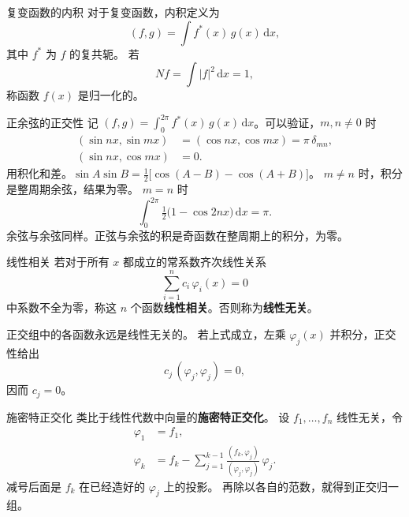 \documentclass[fontset=windows, chinese, 10pt, xcolor=dvipsnames]{beamer}
\begin{document}
\begin{frame}{复变函数的内积}
  对于复变函数，内积定义为
  \begin{equation*}
    (f,g)=\int f^*(x)\,g(x)\,\mathrm{d}x,
  \end{equation*}
  其中 $f^*$ 为 $f$ 的复共轭。
  若
  \begin{equation*}
    Nf=\int |f|^2\,\mathrm{d}x=1,
  \end{equation*}
  称函数 $f(x)$ 是归一化的。
\end{frame}

\begin{frame}{正余弦的正交性}
  记 $(f,g)=\displaystyle\int_0^{2\pi} f^*(x)\,g(x)\,\mathrm{d}x$。可以验证，$m,n\neq 0$ 时
  \begin{align*}
    (\sin nx,\sin mx)
      &=(\cos nx,\cos mx)=\pi\,\delta_{mn},\\
    (\sin nx,\cos mx)&=0.
  \end{align*}
  用积化和差。$\sin A\sin B=\tfrac12\bigl[\cos(A-B)-\cos(A+B)\bigr]$。
  $m\neq n$ 时，积分是整周期余弦，结果为零。
  $m=n$ 时
  \begin{equation*}
    \int_0^{2\pi}\tfrac12\bigl(1-\cos 2nx\bigr)\,\mathrm{d}x=\pi.
  \end{equation*}
  余弦与余弦同样。正弦与余弦的积是奇函数在整周期上的积分，为零。
\end{frame}

\begin{frame}{线性相关}
  若对于所有 $x$ 都成立的常系数齐次线性关系
  \begin{equation*}
    \sum_{i=1}^n c_i\,\varphi_i(x)=0
  \end{equation*}
  中系数不全为零，称这 $n$ 个函数\textbf{线性相关}。否则称为\textbf{线性无关}。
  \vspace{0.5em}

  正交组中的各函数永远是线性无关的。
  若上式成立，左乘 $\varphi_j(x)$ 并积分，正交性给出
  \begin{equation*}
    c_j\,(\varphi_j,\varphi_j)=0,
  \end{equation*}
  因而 $c_j=0$。
\end{frame}

\begin{frame}{施密特正交化}
  类比于线性代数中向量的\textbf{施密特正交化}。
  设 $f_1,\ldots,f_n$ 线性无关，令
  \begin{align*}
    \varphi_1&=f_1,\\
    \varphi_k&=f_k-\sum_{j=1}^{k-1}
      \frac{(f_k,\varphi_j)}{(\varphi_j,\varphi_j)}\,\varphi_j.
  \end{align*}
  减号后面是 $f_k$ 在已经造好的 $\varphi_j$ 上的投影。
  再除以各自的范数，就得到正交归一组。
\end{frame}
\end{document}
